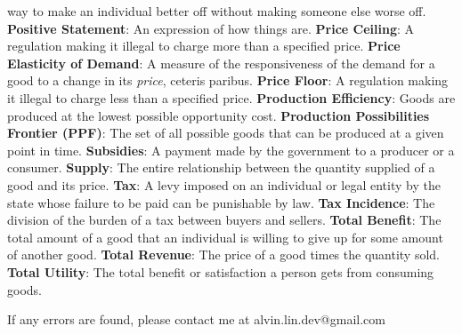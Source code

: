 \documentclass[letterpaper, 12pt]{article}
\begin{document}
way to make an individual better off without making someone else worse off.
\newline
\textbf{Positive Statement}: An expression of how things are.
\newline
\textbf{Price Ceiling}: A regulation making it illegal to charge more than
a specified price.
\newline
\textbf{Price Elasticity of Demand}: A measure of the responsiveness of the
demand for a good to a change in its \textit{price}, ceteris paribus.
\newline
\textbf{Price Floor}: A regulation making it illegal to charge less than
a specified price.
\newline
\textbf{Production Efficiency}: Goods are produced at the lowest possible
opportunity cost.
\newline
\textbf{Production Possibilities Frontier (PPF)}: The set of all possible goods
that can be produced at a given point in time.
\newline
\textbf{Subsidies}: A payment made by the government to a producer or a
consumer.
\newline
\textbf{Supply}: The entire relationship between the quantity supplied of a
good and its price.
\newline
\textbf{Tax}: A levy imposed on an individual or legal entity by the state
whose failure to be paid can be punishable by law.
\newline
\textbf{Tax Incidence}: The division of the burden of a tax between buyers and
sellers.
\newline
\textbf{Total Benefit}: The total amount of a good that an individual is
willing to give up for some amount of another good.
\newline
\textbf{Total Revenue}: The price of a good times the quantity sold.
\newline
\textbf{Total Utility}: The total benefit or satisfaction a person gets from
consuming goods.

\begin{center}
  If any errors are found, please contact me at alvin.lin.dev@gmail.com
\end{center}
\end{document}
